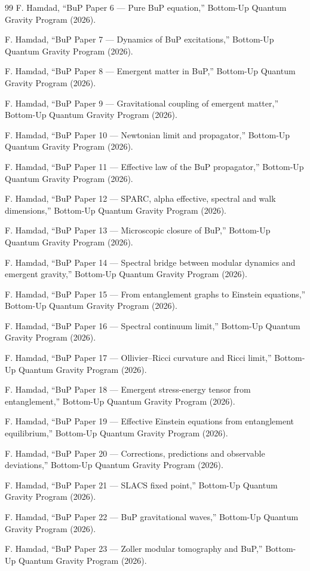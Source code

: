 \documentclass[11pt,a4paper]{article}
\begin{document}
\begin{thebibliography}{99}
F. Hamdad,
``BuP Paper 6 --- Pure BuP equation,''
Bottom-Up Quantum Gravity Program (2026).

F. Hamdad,
``BuP Paper 7 --- Dynamics of BuP excitations,''
Bottom-Up Quantum Gravity Program (2026).

F. Hamdad,
``BuP Paper 8 --- Emergent matter in BuP,''
Bottom-Up Quantum Gravity Program (2026).

F. Hamdad,
``BuP Paper 9 --- Gravitational coupling of emergent matter,''
Bottom-Up Quantum Gravity Program (2026).

F. Hamdad,
``BuP Paper 10 --- Newtonian limit and propagator,''
Bottom-Up Quantum Gravity Program (2026).

F. Hamdad,
``BuP Paper 11 --- Effective law of the BuP propagator,''
Bottom-Up Quantum Gravity Program (2026).

F. Hamdad,
``BuP Paper 12 --- SPARC, alpha effective, spectral and walk dimensions,''
Bottom-Up Quantum Gravity Program (2026).

F. Hamdad,
``BuP Paper 13 --- Microscopic closure of BuP,''
Bottom-Up Quantum Gravity Program (2026).

F. Hamdad,
``BuP Paper 14 --- Spectral bridge between modular dynamics and emergent gravity,''
Bottom-Up Quantum Gravity Program (2026).

F. Hamdad,
``BuP Paper 15 --- From entanglement graphs to Einstein equations,''
Bottom-Up Quantum Gravity Program (2026).

F. Hamdad,
``BuP Paper 16 --- Spectral continuum limit,''
Bottom-Up Quantum Gravity Program (2026).

F. Hamdad,
``BuP Paper 17 --- Ollivier--Ricci curvature and Ricci limit,''
Bottom-Up Quantum Gravity Program (2026).

F. Hamdad,
``BuP Paper 18 --- Emergent stress-energy tensor from entanglement,''
Bottom-Up Quantum Gravity Program (2026).

F. Hamdad,
``BuP Paper 19 --- Effective Einstein equations from entanglement equilibrium,''
Bottom-Up Quantum Gravity Program (2026).

F. Hamdad,
``BuP Paper 20 --- Corrections, predictions and observable deviations,''
Bottom-Up Quantum Gravity Program (2026).

F. Hamdad,
``BuP Paper 21 --- SLACS fixed point,''
Bottom-Up Quantum Gravity Program (2026).

F. Hamdad,
``BuP Paper 22 --- BuP gravitational waves,''
Bottom-Up Quantum Gravity Program (2026).

F. Hamdad,
``BuP Paper 23 --- Zoller modular tomography and BuP,''
Bottom-Up Quantum Gravity Program (2026).

\end{thebibliography}
\end{document}
